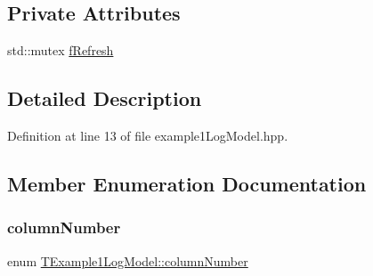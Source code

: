 \subsection*{Private Attributes}
\begin{DoxyCompactItemize}
\item 
std\+::mutex \hyperlink{class_t_example1_log_model_af19d00cf74d3dc54e2ba8ddd015d4dc6}{f\+Refresh}
\end{DoxyCompactItemize}


\subsection{Detailed Description}


Definition at line 13 of file example1\+Log\+Model.\+hpp.



\subsection{Member Enumeration Documentation}
\mbox{\label{class_t_example1_log_model_a35176287f620f85dcd35feb1f2bf138d}} 
\subsubsection{\texorpdfstring{column\+Number}{columnNumber}}
{\footnotesize\ttfamily enum \hyperlink{class_t_example1_log_model_a35176287f620f85dcd35feb1f2bf138d}{T\+Example1\+Log\+Model\+::column\+Number}\hspace{0.3cm}{\ttfamily [private]}}

